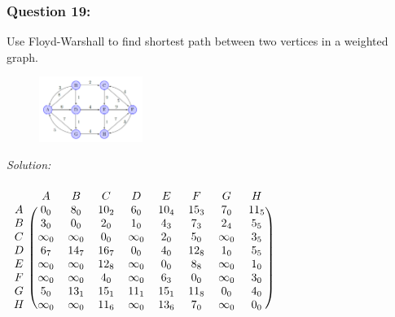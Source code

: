 \documentclass[a4paper]{article}
\begin{document}
	\subsubsection*{Question 19:}
	Use Floyd-Warshall to find shortest path between two vertices in a weighted graph.
	\begin{figure}[H]
		\centering
		\includegraphics[width=0.3\textwidth]{tut919.png}
	\end{figure}
	\textit{Solution:} \\ \\
$\begin{blockarray}{ccccccccc}
	& A & B & C & D & E & F & G & H \\
	\begin{block}{c(cccccccc)}
		A & 0_0 & 8_0 & 10_2 & 6_0 & 10_4 & 15_3 & 7_0 & 11_5 \\
		B & 3_0 & 0_0 & 2_0 & 1_0 & 4_3 & 7_3 & 2_4 & 5_5 \\
		C & \infty_0 & \infty_0 & 0_0 & \infty_0 & 2_0 & 5_0 & \infty_0 & 3_5 \\
		D & 6_7 & 14_7 & 16_7 & 0_0 & 4_0 & 12_8 & 1_0 & 5_5 \\
		E & \infty_0 & \infty_0 & 12_8 & \infty_0 & 0_0 & 8_8 & \infty_0 & 1_0 \\
		F & \infty_0 & \infty_0 & 4_0 & \infty_0 & 6_3 & 0_0 & \infty_0 & 3_0 \\
		G & 5_0 & 13_1 & 15_1 & 11_1 & 15_1 & 11_8 & 0_0 & 4_0 \\
		H & \infty_0 & \infty_0 & 11_6 & \infty_0 & 13_6 & 7_0 & \infty_0 & 0_0 \\
	\end{block}
\end{blockarray}$

\end{document}
